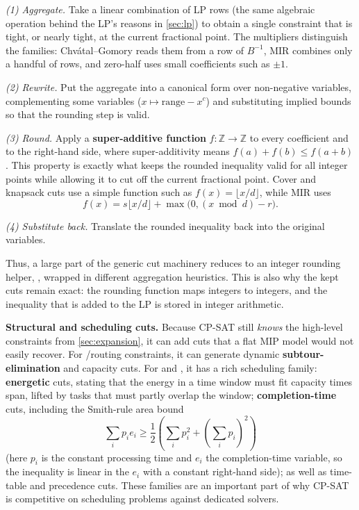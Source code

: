 \emph{(1) Aggregate.} Take a linear combination of LP rows (the same algebraic
operation behind the LP's reasons in \cref{sec:lp}) to obtain a single
constraint that is tight, or nearly tight, at the current fractional point. The
multipliers distinguish the families: Chvátal--Gomory reads them from a row of
$B^{-1}$, MIR combines only a handful of rows, and zero-half uses small
coefficients such as $\pm 1$.

\emph{(2) Rewrite.} Put the aggregate into a canonical form over non-negative
variables, complementing some variables ($x \mapsto \text{range}-x^c$) and
substituting implied bounds so that the rounding step is valid.

\emph{(3) Round.} Apply a \textbf{super-additive function}
$f:\mathbb{Z}\to\mathbb{Z}$ to every coefficient and to the right-hand side,
where super-additivity means $f(a)+f(b)\le f(a+b)$. This property is exactly
what keeps the rounded inequality valid for all integer points while allowing it
to cut off the current fractional point. Cover and knapsack cuts use a simple
function such as $f(x)=\lfloor x/d\rfloor$, while MIR uses
\[
  f(x)=s\lfloor x/d\rfloor+\max\!\bigl(0,(x \bmod d)-r\bigr).
\]

\emph{(4) Substitute back.} Translate the rounded inequality back into the
original variables.

Thus, a large part of the generic cut machinery reduces to an integer rounding
helper, , wrapped in different
aggregation heuristics. This is also why the kept cuts remain exact: the
rounding function maps integers to integers, and the inequality that is added to
the LP is stored in integer arithmetic.

\textbf{Structural and scheduling cuts.} Because CP-SAT still \emph{knows} the
high-level constraints from \cref{sec:expansion}, it can add cuts that a
flat MIP model would not easily recover. For
/routing constraints, it can generate dynamic
\textbf{subtour-elimination} and capacity cuts. For
 and
, it has a rich scheduling family:
\textbf{energetic} cuts, stating that the energy in a time window must fit
capacity times span, lifted by tasks that must partly overlap the window;
\textbf{completion-time} cuts, including the Smith-rule area bound
\[
  \sum_i p_i e_i \ge \frac12\left(\sum_i p_i^2 + \left(\sum_i p_i\right)^2\right)
\]
(here $p_i$ is the constant processing time and $e_i$ the completion-time
variable, so the inequality is linear in the $e_i$ with a constant right-hand
side); as well as time-table and precedence cuts. These families are an important part
of why CP-SAT is competitive on scheduling problems against dedicated solvers.

